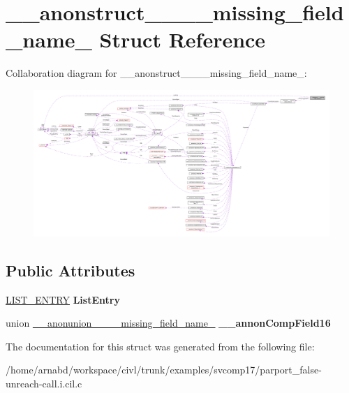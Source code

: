 \hypertarget{struct____anonstruct________missing__field__name__51}{}\section{\+\_\+\+\_\+anonstruct\+\_\+\+\_\+\+\_\+\+\_\+missing\+\_\+field\+\_\+name\+\_ Struct Reference}
\label{struct____anonstruct________missing__field__name__51}


Collaboration diagram for \+\_\+\+\_\+anonstruct\+\_\+\+\_\+\+\_\+\+\_\+missing\+\_\+field\+\_\+name\+\_\+:
\nopagebreak
\begin{figure}[H]
\begin{center}
\leavevmode
\includegraphics[width=350pt]{struct____anonstruct________missing__field__name__51__coll__graph}
\end{center}
\end{figure}
\subsection*{Public Attributes}
\begin{DoxyCompactItemize}
\item 
\hypertarget{struct____anonstruct________missing__field__name__51_a47b96014791010552275db310cb34dba}{}\hyperlink{struct__LIST__ENTRY}{L\+I\+S\+T\+\_\+\+E\+N\+T\+R\+Y} {\bfseries List\+Entry}\label{struct____anonstruct________missing__field__name__51_a47b96014791010552275db310cb34dba}

\item 
\hypertarget{struct____anonstruct________missing__field__name__51_aece2576595d9755e30adc9b0fd334116}{}union \hyperlink{union____anonunion________missing__field__name__52}{\+\_\+\+\_\+anonunion\+\_\+\+\_\+\+\_\+\+\_\+missing\+\_\+field\+\_\+name\+\_} {\bfseries \+\_\+\+\_\+annon\+Comp\+Field16}\label{struct____anonstruct________missing__field__name__51_aece2576595d9755e30adc9b0fd334116}

\end{DoxyCompactItemize}


The documentation for this struct was generated from the following file\+:\begin{DoxyCompactItemize}
\item 
/home/arnabd/workspace/civl/trunk/examples/svcomp17/parport\+\_\+false-\/unreach-\/call.\+i.\+cil.\+c\end{DoxyCompactItemize}
